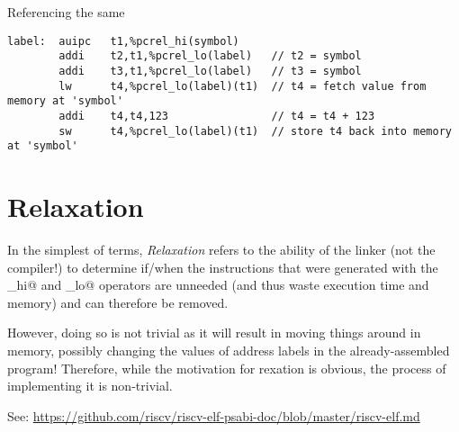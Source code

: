 Referencing the same \verb@%pcrel_hi@ in multiple subsequent uses of \verb@%pcrel_lo@ is legal:
{\small
\begin{verbatim}
label:  auipc   t1,%pcrel_hi(symbol)
        addi    t2,t1,%pcrel_lo(label)   // t2 = symbol
        addi    t3,t1,%pcrel_lo(label)   // t3 = symbol
        lw      t4,%pcrel_lo(label)(t1)  // t4 = fetch value from memory at 'symbol'
        addi    t4,t4,123                // t4 = t4 + 123
        sw      t4,%pcrel_lo(label)(t1)  // store t4 back into memory at 'symbol'
\end{verbatim}
}





\section{Relaxation}

In the simplest of terms, {\em Relaxation} refers to the ability of the 
linker (not the compiler!) to determine if/when the instructions that
were generated with the \verb@xxx_hi@ and \verb@xxx_lo@ operators are
unneeded (and thus waste execution time and memory) and can therefore
be removed.

However, doing so is not trivial as it will result in moving things around 
in memory, possibly changing the values of address labels in the 
already-assembled program!  Therefore, while the motivation for 
rexation is obvious, the process of implementing it is non-trivial.

See: \url{https://github.com/riscv/riscv-elf-psabi-doc/blob/master/riscv-elf.md}
